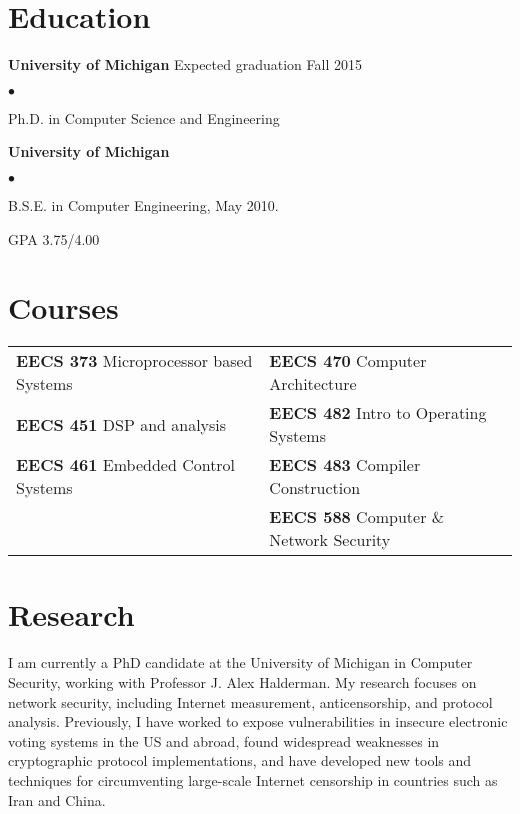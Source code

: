 \documentclass{res}
\newcommand{\sqitem}{\item[\tiny$\blacksquare$]}
\newcommand{\sqlist}{\begin{list}{$\bullet$}
  { \setlength{\itemsep}{0pt}
	\setlength{\parsep}{0pt}
	\setlength{\topsep}{0pt}
	\setlength{\partopsep}{0pt}
	\setlength{\leftmargin}{6.0em}
	\setlength{\labelsep}{2.5em} } }
\newcommand{\sqend}{\end{list}}
\begin{document}

\address{\emph{Current Address}	\\
			1885 Fuller Rd	\\
			Ann Arbor, MI 48105			\\
										\\
			phone: 734.330.8702			\\
			email: ewust@umich.edu}

\begin{resume}

\section{Education}
	\textbf{University of Michigan}  Expected graduation Fall 2015%
	\sqlist	
		\sqitem Ph.D. in Computer Science and Engineering 
	\sqend

	\textbf{University of Michigan}
	\sqlist
		\sqitem B.S.E. in Computer Engineering, May 2010.
		\sqitem GPA 3.75/4.00
	\sqend

\section{Courses}
	\begin{tabular}{l l}
	\textbf{EECS 373} Microprocessor based Systems & 
					\textbf{EECS 470} Computer Architecture \\
	\textbf{EECS 451} DSP and analysis & 
					\textbf{EECS 482} Intro to Operating Systems \\
	\textbf{EECS 461} Embedded Control Systems & 
					\textbf{EECS 483} Compiler Construction \\
											  &
					\textbf{EECS 588} Computer \& Network Security \\
	\end{tabular}
\fi

\section{Research}

I am currently a PhD candidate at the University of Michigan in Computer
Security, working with Professor J. Alex Halderman. My research focuses on
network security, including Internet measurement, anticensorship, and protocol
analysis.  Previously, I have worked to expose vulnerabilities in insecure
electronic voting systems in the US and abroad, found widespread weaknesses in
cryptographic protocol implementations, and have developed new tools and
techniques for circumventing large-scale Internet censorship in countries such
as Iran and China.


\end{resume}
\end{document}
